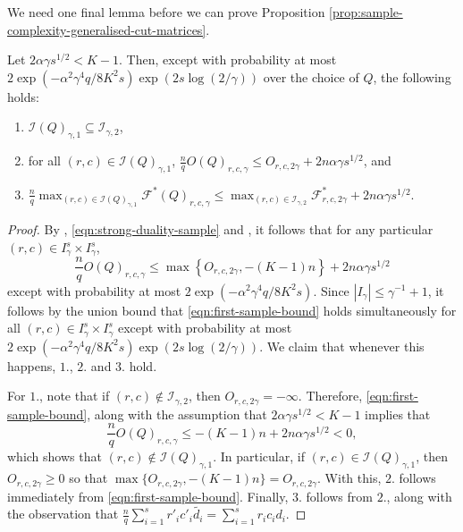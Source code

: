 \documentclass[final, 12pt]{colt2018}
\newcommand{\F}{\mathcal{F}}
\newcommand{\I}{\mathcal{I}}
\theoremstyle{definition}
\theoremstyle{plain}
\begin{document}
We need one final lemma before we can prove Proposition \ref{prop:sample-complexity-generalised-cut-matrices}. 
\begin{lemma} 
\label{lemma:upper-bound-sample-primal}
Let $2\alpha\gamma s^{1/2} < K-1$. Then, except with probability at most $2\exp(-\alpha^2\gamma^4q/8K^2s)\exp(2s\log(2/\gamma))$ over the choice of $Q$, the following holds: 
\begin{enumerate}
\item $\I(Q)_{\gamma,1} \subseteq \I_{\gamma,2}$,
\item for all $(r,c)\in \I(Q)_{\gamma,1}$, $\frac{n}{q}O(Q)_{r,c,\gamma} \leq O_{r,c,2\gamma} + 2n\alpha \gamma s^{1/2}$, and 
\item $\frac{n}{q}\max_{(r,c)\in \I(Q)_{\gamma,1}} \F^*(Q)_{r,c,\gamma} \leq \max_{(r,c)\in \I_{\gamma,2}}\F^*_{r,c,2\gamma}+ 2n\alpha \gamma s^{1/2}$.
\end{enumerate}
\end{lemma}
\begin{proof}
By , \cref{eqn:strong-duality-sample} and , it follows that for any particular $(r,c) \in I_{\gamma}^{s}\times I_{\gamma}^{s}$, 
\begin{equation}
\label{eqn:first-sample-bound}
\frac{n}{q}O(Q)_{r,c,\gamma} \leq \max\left\{O_{r,c,2\gamma},-(K-1)n\right\} + 2n\alpha \gamma s^{1/2}
\end{equation}
except with probability at most $2\exp(-\alpha^2\gamma^4q/8K^2s)$. Since $|I_\gamma | \leq \gamma^{-1} + 1$, it follows by the union bound that \cref{eqn:first-sample-bound} holds simultaneously for all $(r,c) \in I_{\gamma}^{s}\times I_{\gamma}^{s}$ except with probability at most 
$2\exp(-\alpha^2\gamma^4q/8K^2s)\exp(2s\log(2/\gamma))$. We claim that whenever this happens, $1.$, $2.$ and $3.$ hold. 

For $1.$, note that if $(r,c)\notin \I_{\gamma,2}$, then $O_{r,c,2\gamma} = -\infty$. Therefore, \cref{eqn:first-sample-bound}, along with the assumption that $2\alpha \gamma s^{1/2} < K-1$ implies that 
$$ \frac{n}{q}O(Q)_{r,c,\gamma} \leq -(K-1)n + 2n\alpha\gamma s^{1/2} < 0,$$
which shows that $(r,c)\notin \I(Q)_{\gamma,1}$. In particular, if $(r,c) \in \I(Q)_{\gamma,1}$, then $O_{r,c,2\gamma} \geq 0$ so that $\max\{O_{r,c,2\gamma}, -(K-1)n\} = O_{r,c,2\gamma}$. With this, $2.$ follows immediately from \cref{eqn:first-sample-bound}. Finally, $3.$ follows from $2.$, along with the observation that $\frac{n}{q}\sum_{i=1}^{s}r'_ic'_i\tilde{d_i} = \sum_{i=1}^{s}r_ic_id_i$. 
\end{proof}
\end{document}
